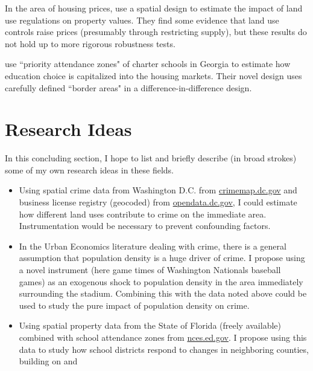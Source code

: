 \documentclass{article}
\begin{document}
In the area of housing prices,  use a spatial design to estimate the impact of land use regulations on property values. They find some evidence that land use controls raise prices (presumably through restricting supply), but these results do not hold up to more rigorous robustness tests.

 use ``priority attendance zones" of charter schools in Georgia to estimate how education choice is capitalized into the housing markets. Their novel design uses carefully defined ``border areas" in a difference-in-difference design.

\section{Research Ideas}
In this concluding section, I hope to list and briefly describe (in broad strokes) some of my own research ideas in these fields. 

\begin{itemize}
\item Using spatial crime data from Washington D.C. from \url{crimemap.dc.gov} and business license registry (geocoded) from \url{opendata.dc.gov}, I could estimate how different land uses contribute to crime on the immediate area. Instrumentation would be necessary to prevent confounding factors.

\item In the Urban Economics literature dealing with crime, there is a general assumption that population density is a huge driver of crime. I propose using a novel instrument (here game times of Washington Nationals baseball games) as an exogenous shock to population density in the area immediately surrounding the stadium. Combining this with the data noted above could be used to study the pure impact of population density on crime. 

\item Using spatial property data from the State of Florida (freely available) combined with school attendance zones from \url{nces.ed.gov}. I propose using this data to study how school districts respond to changes in neighboring counties, building on  and \end{itemize}

\newpage


\end{document}
